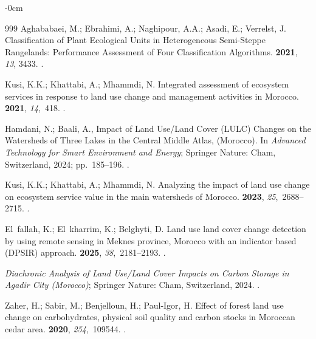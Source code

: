 \documentclass[geomatics,article,accept,pdftex,oneauthor]{Definitions/mdpi}
\begin{document}
\begin{adjustwidth}{-\extralength}{0cm}
\begin{thebibliography}{999}
Aghababaei, M.; Ebrahimi, A.; Naghipour, A.A.; Asadi, E.; Verrelst, J.
\newblock Classification of Plant Ecological Units in Heterogeneous Semi-Steppe
  Rangelands: Performance Assessment of Four Classification Algorithms.
 {\bf 2021}, {\em 13}, 3433.
.

Kusi, K.K.; Khattabi, A.; Mhammdi, N.
\newblock Integrated assessment of ecosystem services in response to land use
  change and management activities in Morocco.
 {\bf 2021}, {\em 14},~418.
.

Hamdani, N.; Baali, A., Impact of Land Use/Land Cover (LULC) Changes on the
  Watersheds of Three Lakes in the Central Middle Atlas, (Morocco).
\newblock In {\em Advanced Technology for Smart Environment and Energy};
  Springer Nature: Cham, Switzerland, 2024; \mbox{pp. 185--196.}
.

Kusi, K.K.; Khattabi, A.; Mhammdi, N.
\newblock Analyzing the impact of land use change on ecosystem service value in
  the main watersheds of Morocco.
 {\bf 2023}, {\em
  25},~2688--2715.
.

El~fallah, K.; El~kharrim, K.; Belghyti, D.
\newblock Land use land cover change detection by using remote sensing in
  Meknes province, Morocco with an indicator based (DPSIR) approach.
 {\bf 2025}, {\em
  38},~2181–2193.
.

{\em Diachronic Analysis of Land Use/Land Cover Impacts on Carbon Storage in
  Agadir City (Morocco)}; Springer Nature: Cham,  Switzerland, 2024.  
.

Zaher, H.; Sabir, M.; Benjelloun, H.; Paul-Igor, H.
\newblock Effect of forest land use change on carbohydrates, physical soil
  quality and carbon stocks in Moroccan cedar area.
 {\bf 2020}, {\em
  254},~109544.
.


\end{thebibliography}
\end{adjustwidth}
\end{document}
